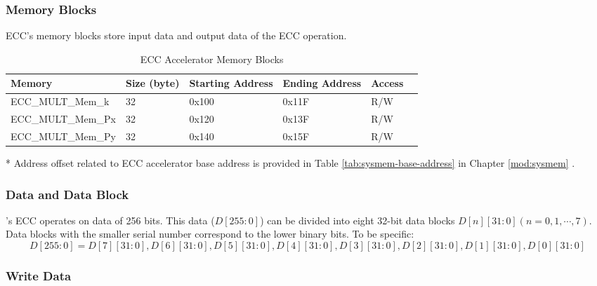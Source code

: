 \documentclass[main\_\_EN.tex]{subfiles}
\begin{document}
\subsubsection{Memory Blocks}

ECC's memory blocks store input data and output data of the ECC operation. 

\begin{table}[H]
    \centering
    \caption{ECC Accelerator Memory Blocks} \label{tab:ecc-memory}
    \begin{threeparttable}
    \begin{tabular}{ | l | l | l | l | l | l | }
    \hline
        \rowcolor{lightgray}
        \textbf{Memory} & \textbf{Size (byte)}  &  \textbf{Starting Address}\tnote{*} &  \textbf{Ending Address} \tnote{*} & \textbf{Access}   \\ \hline
        ECC\_MULT\_Mem\_k    & 32  & 0x100 & 0x11F & R/W \\ \hline
        ECC\_MULT\_Mem\_Px   & 32  & 0x120 & 0x13F & R/W \\ \hline
        ECC\_MULT\_Mem\_Py   & 32  & 0x140 & 0x15F & R/W \\ \hline
    \end{tabular}
    \begin{tablenotes}
        \item[*] Address offset related to ECC accelerator base address is provided in Table \ref{tab:sysmem-base-address} in Chapter \ref{mod:sysmem} \textit{}.
    \end{tablenotes}
    \end{threeparttable}
\end{table}

\subsubsection{Data and Data Block}

\chipname{}'s ECC operates on data of 256 bits. This data ($D[255:0]$) can be divided into eight 32-bit data blocks $D[n][31:0] (n=0, 1, \cdots, 7)$. Data blocks with the smaller serial number correspond to the lower binary bits. To be specific:
\[
D[255:0] = {D[7][31:0],D[6][31:0],D[5][31:0],
D[4][31:0],D[3][31:0],D[2][31:0],D[1][31:0],D[0][31:0]}
\]

\subsubsection{Write Data}
\end{document}
